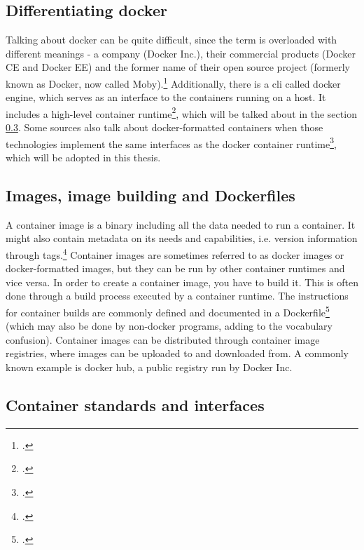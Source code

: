 \subsection{Differentiating docker}
Talking about docker can be quite difficult, since the term is overloaded with different meanings - a company (Docker Inc.), their commercial products (Docker CE and Docker EE) and the former name of their open source project (formerly known as Docker, now called Moby).\footcite[][, section 'What is Moby?']{dockerMoby}
Additionally, there is a \gls{cli} called docker engine, which serves as an interface to the containers running on a host. It includes a high-level container runtime\footcite[][, section 'Develop, Ship and Run Any Application, Anywhere']{dockerEngine}, which will be talked about in the section \ref{runtimes}.
Some sources also talk about docker-formatted containers when those technologies implement the same interfaces as the docker container runtime\footcite[][, section '1.11. Working with Docker formatted containers']{dockerFormatted}, which will be adopted in this thesis.

\subsection{Images, image building and Dockerfiles}
A container image is a binary including all the data needed to run a container. It might also contain metadata on its needs and capabilities, i.e. version information through tags.\footcite[][, section 'Docker Images']{redhatImages}
Container images are sometimes referred to as docker images or docker-formatted images, but they can be run by other container runtimes and vice versa.
In order to create a container image, you have to build it. This is often done through a build process executed by a container runtime. The instructions for container builds are commonly defined and documented in a Dockerfile\footcite[][, section 'Dockerfile reference']{dockerfileDocs} (which may also be done by non-docker programs, adding to the vocabulary confusion).
Container images can be distributed through container image registries, where images can be uploaded to and downloaded from. A commonly known example is docker hub, a public registry run by Docker Inc.

\subsection{Container standards and interfaces} \label{runtimes}


